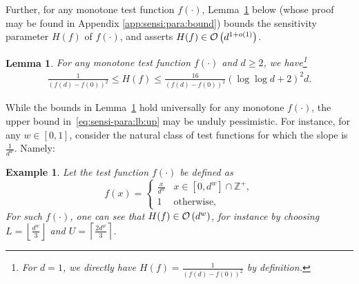 \documentclass[onecolumn,letterpaper]{IEEEtran}
\newtheorem{lemma}{Lemma}
\newtheorem{remark}{Remark}
\newtheorem{example}{Example}
\newcommand{\up}{{U}}
\newcommand{\lw}{{L}}
\newcommand{\fH}{{H(f)}}
\begin{document}
Further, for any monotone test function $f(\cdot)$, Lemma~\ref{lem:sensi:para:bound} below (whose proof may be found in Appendix \ref{app:sensi:para:bound}) bounds the sensitivity parameter $\fH$ of $f(\cdot)$, and asserts $\fH\in  {\cal O}\left(d^{1+o(1)}\right)$. 

\begin{lemma} 
\label{lem:sensi:para:bound}
For any monotone test function $f(\cdot)$ and $d \geq 2$, we have\footnote{For $d=1$, we directly have $\fH=\frac{1}{\left(f(d)-f(0)\right)^2}$ by definition.}
\begin{align}
\label{eq:sensi-para:lb:up}
 \frac{1}{\left(f(d)-f(0)\right)^2} \leq \fH\leq \frac {16}{\left(f(d)-f(0)\right)^2}\left(\log\log d +2\right)^2 d.  
\end{align}
\end{lemma}



While the bounds in Lemma~\ref{lem:sensi:para:bound} hold universally for any monotone $f(\cdot)$, the upper bound in~\eqref{eq:sensi-para:lb:up} may be unduly pessimistic. 
For instance, for any $w\in [0,1]$, consider the natural class of test functions for which the slope is $\frac {1}{d^w}$. Namely:

\begin{example}\label{ex:dwf} Let the test function $f(\cdot)$ be defined as 
\begin{equation} 
\label{eq:linear-alpha:function}
    f(x) = 
    \left\{
    \begin{array}{ll}
    \frac{x}{d^{w}} & x \in \left[0, d^{w}\right]\cap \mathbb{Z}^+, \\
    1 & \text{otherwise} ,
    \end{array} 
    \right.
\end{equation}
For such $f(\cdot)$, one can see that $\fH\in {\cal O} \left(d^w\right)$, for instance by choosing $\lw = \left \lfloor \frac{d^w}{3} \right \rfloor$ and $\up = \left \lceil \frac{2d^w}{3} \right \rceil$. 
\end{example}
\end{document}
